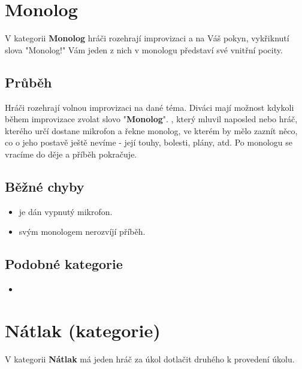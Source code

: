 \documentclass[main.tex]{subfiles}
\begin{document}
 
 
 
 
\needspace{5cm} \section{Monolog} \label{monolog}  
 
 
V kategorii \textbf{Monolog}{} hráči rozehrají improvizaci a na Váš pokyn, vykřiknutí slova "Monolog!"{} Vám jeden z nich v monologu představí své vnitřní pocity. 
 
 
\subsection{Průběh} Hráči rozehrají volnou improvizaci na dané téma. Diváci mají možnost kdykoli během improvizace zvolat slovo "\textbf{Monolog}{}". , který mluvil naposled nebo hráč, kterého určí  dostane mikrofon a řekne monolog, ve kterém by mělo zaznít něco, co o jeho postavě ještě nevíme - její touhy, bolesti, plány, atd. Po monologu se vracíme do děje a příběh pokračuje.  
 
\subsection{ Běžné chyby } \begin{itemize}
\item {} je dán vypnutý mikrofon.
\item {} svým monologem nerozvíjí příběh.
\end{itemize}
 
 
\subsection{ Podobné kategorie } \begin{itemize}
\item {}
\end{itemize}
 
 
 
 
\needspace{5cm} \section{Nátlak (kategorie)} \label{nátlak (kategorie)}  
 
V kategorii \textbf{Nátlak}{} má jeden hráč za úkol dotlačit druhého k provedení úkolu. 
 
\end{document}
